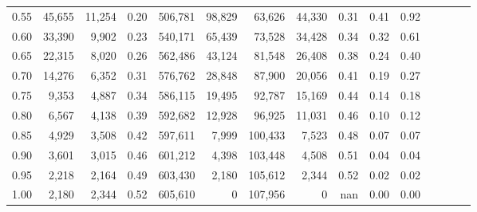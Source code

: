 \begin{tabular}{rrrcrrrrrrrrrrr}
0.55 &  45,655 &  11,254 &                                       0.20 &  506,781 &   98,829 &   63,626 &   44,330 &  0.31 &  0.41 &                         0.92 \\
0.60 &  33,390 &   9,902 &                                       0.23 &  540,171 &   65,439 &   73,528 &   34,428 &  0.34 &  0.32 &                         0.61 \\
0.65 &  22,315 &   8,020 &                                       0.26 &  562,486 &   43,124 &   81,548 &   26,408 &  0.38 &  0.24 &                         0.40 \\
0.70 &  14,276 &   6,352 &                                       0.31 &  576,762 &   28,848 &   87,900 &   20,056 &  0.41 &  0.19 &                         0.27 \\
0.75 &   9,353 &   4,887 &                                       0.34 &  586,115 &   19,495 &   92,787 &   15,169 &  0.44 &  0.14 &                         0.18 \\
0.80 &   6,567 &   4,138 &                                       0.39 &  592,682 &   12,928 &   96,925 &   11,031 &  0.46 &  0.10 &                         0.12 \\
0.85 &   4,929 &   3,508 &                                       0.42 &  597,611 &    7,999 &  100,433 &    7,523 &  0.48 &  0.07 &                         0.07 \\
0.90 &   3,601 &   3,015 &                                       0.46 &  601,212 &    4,398 &  103,448 &    4,508 &  0.51 &  0.04 &                         0.04 \\
0.95 &   2,218 &   2,164 &                                       0.49 &  603,430 &    2,180 &  105,612 &    2,344 &  0.52 &  0.02 &                         0.02 \\
1.00 &   2,180 &   2,344 &                                       0.52 &  605,610 &        0 &  107,956 &        0 &   nan &  0.00 &                         0.00 \\
\bottomrule
\end{tabular}
